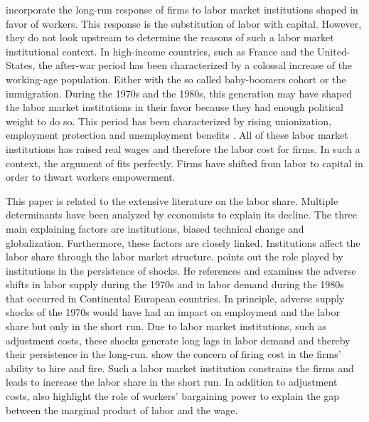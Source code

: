 




\newpage



\cite{Caballero1998} incorporate the long-run response of firms to labor market institutions shaped in favor of workers. This response is the substitution of labor with capital. However, they do not look upstream to determine the reasons of such a labor market institutional context. In high-income countries, such as France and the United-States, the after-war period has been characterized by a colossal increase of the working-age population. Either with the so called baby-boomers cohort or the immigration. During the 1970s and the 1980s, this generation may have shaped the labor market institutions in their favor because they had enough political weight to do so. This period has been characterized by rising unionization, employment protection and unemployment benefits%
. All of these labor market institutions has raised real wages and therefore the labor cost for firms. In such a context, the argument of \cite{Caballero1998} fits perfectly. Firms have shifted from labor to capital in order to thwart workers empowerment.




This paper is related to the extensive literature on the labor share. Multiple determinants have been analyzed by economists to explain its decline. The three main explaining factors are institutions, biased technical change and globalization. Furthermore, these factors are closely linked.
Institutions affect the labor share through the labor market structure. \cite{Blanchard1997} points out the role played by institutions in the persistence of shocks. He references and examines the adverse shifts in labor supply during the 1970s and in labor demand during the 1980s that occurred in Continental European countries. In principle, adverse supply shocks of the 1970s would have had an impact on employment and the labor share but only in the short run. Due to labor market institutions, such as adjustment costs, these shocks generate long lags in labor demand and thereby their persistence in the long-run. \cite{Bentolila1990} show the concern of firing cost in the firms' ability to hire and fire. Such a labor market institution constrains the firms and leads to increase the labor share in the short run. In addition to adjustment costs, \cite{Bentolila2003} also highlight the role of workers' bargaining power to explain the gap between the marginal product of labor and the wage.

